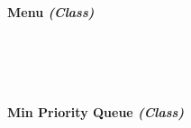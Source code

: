 \begin{FlushLeft}
\begin{enumerate}
    \bk

    \paragraph*{Menu \textit{(Class)}} \mbox{} \\

    \begin{figure}[H]
        \centering
    \end{figure}\\

    \bk
    
    \paragraph*{Min Priority Queue \textit{(Class)}} \mbox{} \\


\end{enumerate}
\end{FlushLeft}
